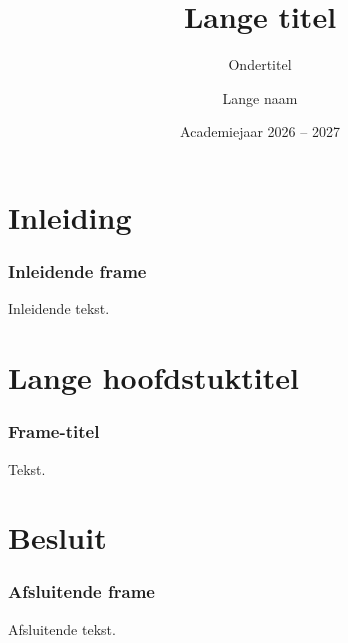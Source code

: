 \documentclass
[kulak,handout] %
{kulakbeamer}
\title[Korte titel]{Lange titel}
\subtitle{Ondertitel}
\author[Korte naam]{Lange naam}
\institute[Kulak]{KU Leuven Kulak}
\date{Academiejaar 2026 -- 2027}
\begin{document}
	
	\begin{titleframe}
		\titlepage
	\end{titleframe}
	
	\begin{outlineframe}[Overzicht]
		\tableofcontents
	\end{outlineframe}
	
	
	\section{Inleiding}
	
	\begin{frame}
		\frametitle{Inleidende frame}
		Inleidende tekst.
	\end{frame}
	
	\section[Korte titel]{Lange hoofdstuktitel}
	
	\begin{frame}
		\frametitle{Frame-titel}
		Tekst.
	\end{frame}
	
	\section{Besluit}
	\begin{frame}
		\frametitle{Afsluitende frame}
		Afsluitende tekst.
	\end{frame}
	
\end{document}

